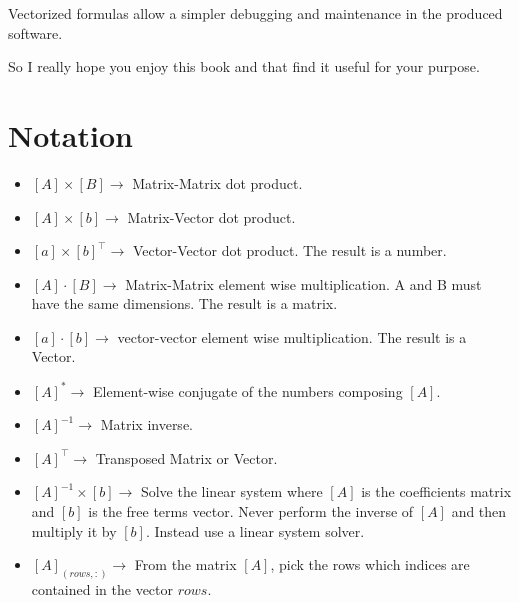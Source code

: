 \documentclass[nols,a4paper,twoside,notoc,fleqn]{tufte-book}
\begin{document}
Vectorized formulas allow a simpler debugging and maintenance in the produced software.

So I really hope you enjoy this book and that find it useful for your purpose.

\chapter{Notation}
\begin{fullwidth}

\begin{multicols}{2}

\begin{itemize}
	
	\item $[A] \times [B] \rightarrow$ Matrix-Matrix dot product.
	
	\item $[A] \times [b] \rightarrow$ Matrix-Vector dot product.
	
	\item $[a] \times [b]^\top \rightarrow$ Vector-Vector dot product. The result is a number.
	
	\item $[A] \cdot [B] \rightarrow$ Matrix-Matrix element wise multiplication. A and B must have the same dimensions. The result is a matrix.
	
	\item $[a] \cdot [b] \rightarrow$ vector-vector element wise multiplication. The result is a Vector.
	
	\item $[A]^{*}\rightarrow$ Element-wise conjugate of the numbers composing $[A]$.
	
	\item $[A]^{-1}\rightarrow$ Matrix inverse.
	
	\item $[A]^{\top}\rightarrow$ Transposed Matrix or Vector.
	
	\item $[A]^{-1} \times [b] \rightarrow$ Solve the linear system where $[A]$ is the coefficients matrix and $[b]$ is the free terms vector. Never perform the inverse of $[A]$ and then multiply it by $[b]$. Instead use a linear system solver.
	
	\item $[A]_{(rows, :)} \rightarrow$ From the matrix $[A]$, pick the rows which indices are contained in the vector $rows$.
	

\end{itemize}
\end{multicols}
\end{fullwidth}
\end{document}
